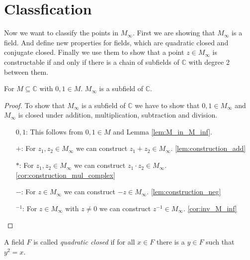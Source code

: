 \section{Classfication}
Now we want to classify the points in $M_{\infty}$. First we are showing that $M_{\infty}$ is a field. 
And define new properties for fields, which are quadratic closed and conjugate closed. 
Finally we use them to show that a point $z\in M_{\infty}$ is constructable if and only if there is a chain of subfields of $\mathbb{C}$ with degree 2 between them.

\begin{theorem}
    \label{thm:MField}
    \leanok
    For $M\subseteq \mathbb{C}$ with $0,1 \in M$. $M_{\infty}$ is a subfield of $\mathbb{C}$.
\end{theorem}
\begin{proof}
    \leanok
    To show that $M_{\infty}$ is a subfield of $\mathbb{C}$ we have to show that $0,1\in M_{\infty}$ and $M_{\infty}$ is closed under addition, multiplication, subtraction and division.
    \begin{itemize}
        \item [$0,1$:] This follows from $0,1 \in M$ and Lemma \ref{lem:M_in_M_inf}.
        \item [$+$:] For $z_1,z_2 \in M_{\infty}$ we can construct $z_1 + z_2 \in M_{\infty}$. \ref{lem:construction_add}
        \item [$*$:] For $z_1,z_2 \in M_{\infty}$ we can construct $z_1 \cdot z_2 \in M_{\infty}$. \ref{cor:construction_mul_complex}
        \item [$-$:] For $z \in M_{\infty}$ we can construct $-z \in M_{\infty}$. \ref{lem:construction_neg}
        \item [$^{-1}$:] For $z \in M_{\infty}$ with $z \ne 0$ we can construct $z^{-1} \in M_{\infty}$. \ref{cor:inv_M_inf}
    \end{itemize}
\end{proof}


\begin{definition}
    \label{def:quadritc_closed_field}
    \leanok
    A field $F$ is called \emph{quadratic closed} if for all $x \in F$ there is a $y \in F$ such that $y^2 = x$.
\end{definition}

